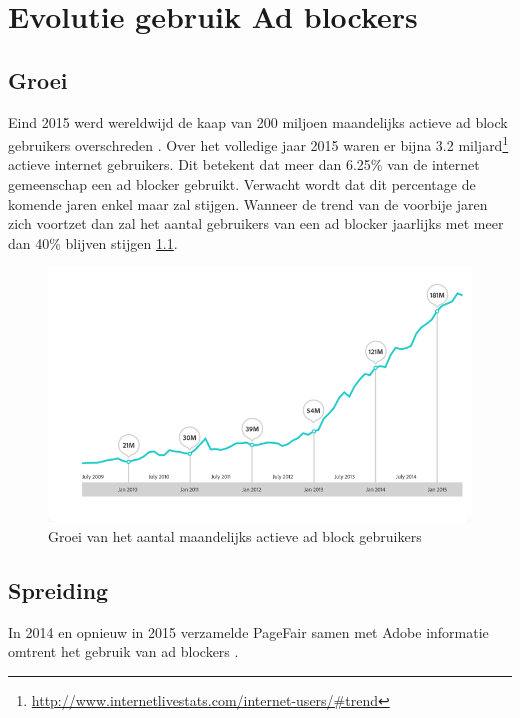 \documentclass[pdftex,a4paper,12pt,twoside]{report}
\begin{document}
\chapter{Evolutie gebruik Ad blockers}
\label{ch:Evolutie gebruik Ad blockers}

\section{Groei}
\label{sec:Groei}
Eind 2015 werd wereldwijd de kaap van 200 miljoen maandelijks actieve ad block gebruikers overschreden \citep{PageFair2015}. Over het volledige jaar 2015 waren er bijna 3.2 miljard\footnote{\url{ http://www.internetlivestats.com/internet-users/\#trend}} actieve internet gebruikers. Dit betekent dat meer dan 6.25\% van de internet gemeenschap een ad blocker gebruikt. Verwacht wordt dat dit percentage de komende jaren enkel maar zal stijgen. Wanneer de trend van de voorbije jaren zich voortzet dan zal het aantal gebruikers van een ad blocker jaarlijks met meer dan 40\% blijven stijgen \ref{fig: adblock-growth}.
\begin{figure}[h!]
\centering
\includegraphics[width=12cm]{img/adblock-growth}
\caption{Groei van het aantal maandelijks actieve ad block gebruikers}
\label{fig: adblock-growth}
\end{figure}



\section{Spreiding}
\label{sec:Spreiding}
In 2014 en opnieuw in 2015 verzamelde PageFair samen met Adobe informatie omtrent het gebruik van ad blockers \citep{PageFair2015,PageFair2014}.
\end{document}
